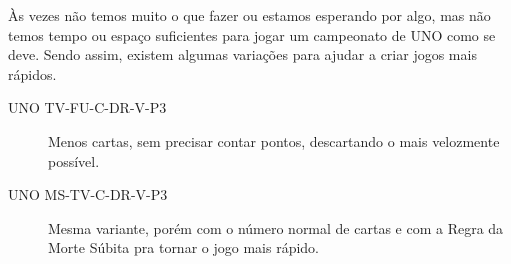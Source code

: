 Às vezes não temos muito o que fazer ou estamos esperando por algo, mas não temos tempo ou espaço suficientes para jogar um campeonato de UNO como se deve. Sendo assim, existem algumas variações para ajudar a criar jogos mais rápidos.

\begin{description}
\item[UNO TV-FU-C-DR-V-P3]{Menos cartas, sem precisar contar pontos, descartando o mais velozmente possível.}
\item[UNO MS-TV-C-DR-V-P3]{Mesma variante, porém com o número normal de cartas e com a Regra da Morte Súbita pra tornar o jogo mais rápido.}
\end{description}